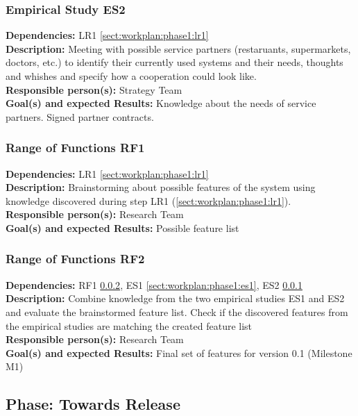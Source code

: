 \documentclass[a4paper,11pt]{article}
\begin{document}
\subsubsection{Empirical Study ES2}
\label{sect:workplan:phase1:es2}
\textbf{Dependencies:} LR1 \ref{sect:workplan:phase1:lr1}\\
\textbf{Description:} Meeting with possible service partners (restaruants, supermarkets, doctors, etc.) to identify their currently used systems and their needs, thoughts and whishes and specify how a cooperation could look like.\\
\textbf{Responsible person(s):} Strategy Team\\
\textbf{Goal(s) and expected Results:} Knowledge about the needs of service partners. Signed partner contracts. \\

\subsubsection{Range of Functions RF1}
\label{sect:workplan:phase1:rf1}
\textbf{Dependencies:} LR1 \ref{sect:workplan:phase1:lr1}\\
\textbf{Description:} Brainstorming about possible features of the system using knowledge discovered during step LR1 (\ref{sect:workplan:phase1:lr1}).\\
\textbf{Responsible person(s):} Research Team\\
\textbf{Goal(s) and expected Results:} Possible feature list\\

\pagebreak
\subsubsection{Range of Functions RF2}
\label{sect:workplan:phase1:rf2}
\textbf{Dependencies:} RF1 \ref{sect:workplan:phase1:rf1}, ES1 \ref{sect:workplan:phase1:es1}, ES2 \ref{sect:workplan:phase1:es2}\\
\textbf{Description:} Combine knowledge from the two empirical studies ES1 and ES2 and evaluate the brainstormed feature list. Check if the discovered features from the empirical studies are matching the created feature list\\
\textbf{Responsible person(s):} Research Team\\
\textbf{Goal(s) and expected Results:} Final set of features for version 0.1 (Milestone M1)\\

\subsection{Phase: Towards Release}
\label{sect:workplan:towardsrelease}
\end{document}
